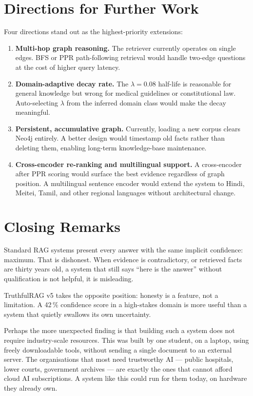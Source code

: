 \section{Directions for Further Work}

Four directions stand out as the highest-priority extensions:

\begin{enumerate}\itemsep0pt
    \item \textbf{Multi-hop graph reasoning.} The retriever currently operates
    on single edges. BFS or PPR path-following retrieval would handle two-edge
    questions at the cost of higher query latency.

    \item \textbf{Domain-adaptive decay rate.} The $\lambda = 0.08$ half-life
    is reasonable for general knowledge but wrong for medical guidelines or
    constitutional law. Auto-selecting $\lambda$ from the inferred domain
    class would make the decay meaningful.

    \item \textbf{Persistent, accumulative graph.} Currently, loading a new
    corpus clears Neo4j entirely. A better design would timestamp old facts
    rather than deleting them, enabling long-term knowledge-base maintenance.

    \item \textbf{Cross-encoder re-ranking and multilingual support.} A
    cross-encoder after PPR scoring would surface the best evidence regardless
    of graph position. A multilingual sentence encoder would extend the system
    to Hindi, Meitei, Tamil, and other regional languages without
    architectural change.
\end{enumerate}

\section{Closing Remarks}

Standard RAG systems present every answer with the same implicit confidence:
maximum. That is dishonest. When evidence is contradictory, or retrieved facts
are thirty years old, a system that still says ``here is the answer'' without
qualification is not helpful, it is misleading.

TruthfulRAG v5 takes the opposite position: honesty is a feature, not a
limitation. A 42\,\% confidence score in a high-stakes domain is more useful
than a system that quietly swallows its own uncertainty.

Perhaps the more unexpected finding is that building such a system does not
require industry-scale resources. This was built by one student, on a laptop,
using freely downloadable tools, without sending a single document to an
external server. The organisations that most need trustworthy AI --- public
hospitals, lower courts, government archives --- are exactly the ones that cannot
afford cloud AI subscriptions. A system like this could run for them today,
on hardware they already own.
